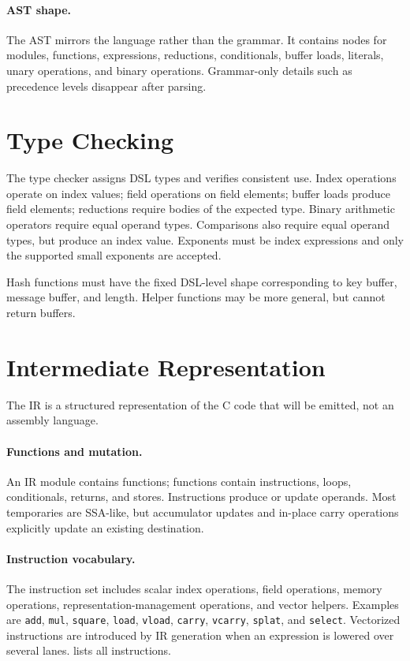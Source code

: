 \paragraph{AST shape.}
The AST mirrors the language rather than the grammar. It contains nodes for modules, functions, expressions, reductions, conditionals, buffer loads, literals, unary operations, and binary operations. Grammar-only details such as precedence levels disappear after parsing.

\section{Type Checking}
\label{sec:type-checking}

The type checker assigns DSL types and verifies consistent use. Index operations operate on index values; field operations on field elements; buffer loads produce field elements; reductions require bodies of the expected type. Binary arithmetic operators require equal operand types. Comparisons also require equal operand types, but produce an index value. Exponents must be index expressions and only the supported small exponents are accepted.

Hash functions must have the fixed DSL-level shape corresponding to key buffer, message buffer, and length. Helper functions may be more general, but cannot return buffers.

\section{Intermediate Representation}
\label{sec:ir}

The IR is a structured representation of the C code that will be emitted, not an assembly language.

\paragraph{Functions and mutation.}
An IR module contains functions; functions contain instructions, loops, conditionals, returns, and stores. Instructions produce or update operands. Most temporaries are SSA-like, but accumulator updates and in-place carry operations explicitly update an existing destination.

\paragraph{Instruction vocabulary.}
The instruction set includes scalar index operations, field operations, memory operations, representation-management operations, and vector helpers. Examples are \texttt{add}, \texttt{mul}, \texttt{square}, \texttt{load}, \texttt{vload}, \texttt{carry}, \texttt{vcarry}, \texttt{splat}, and \texttt{select}. Vectorized instructions are introduced by IR generation when an expression is lowered over several lanes.  lists all instructions.

